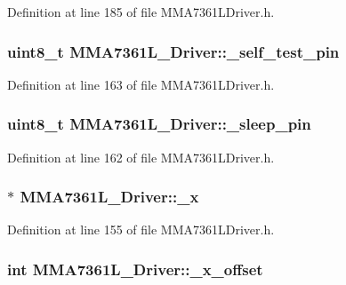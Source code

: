 \-Definition at line 185 of file \-M\-M\-A7361\-L\-Driver.\-h.

\hypertarget{class_m_m_a7361_l___driver_a99cc8f1c06bd9e3c25efa6369f5918f8}{
\subsubsection[{\-\_\-self\-\_\-test\-\_\-pin}]{\setlength{\rightskip}{0pt plus 5cm}uint8\-\_\-t {\bf \-M\-M\-A7361\-L\-\_\-\-Driver\-::\-\_\-self\-\_\-test\-\_\-pin}}}\label{class_m_m_a7361_l___driver_a99cc8f1c06bd9e3c25efa6369f5918f8}


\-Definition at line 163 of file \-M\-M\-A7361\-L\-Driver.\-h.

\hypertarget{class_m_m_a7361_l___driver_a8d123ee5fb711beadf02a8e6230a91dc}{
\subsubsection[{\-\_\-sleep\-\_\-pin}]{\setlength{\rightskip}{0pt plus 5cm}uint8\-\_\-t {\bf \-M\-M\-A7361\-L\-\_\-\-Driver\-::\-\_\-sleep\-\_\-pin}}}\label{class_m_m_a7361_l___driver_a8d123ee5fb711beadf02a8e6230a91dc}


\-Definition at line 162 of file \-M\-M\-A7361\-L\-Driver.\-h.

\hypertarget{class_m_m_a7361_l___driver_a754cbcff98237680540eed964592a519}{
\subsubsection[{\-\_\-x}]{$\ast$ {\bf \-M\-M\-A7361\-L\-\_\-\-Driver\-::\-\_\-x}}}\label{class_m_m_a7361_l___driver_a754cbcff98237680540eed964592a519}


\-Definition at line 155 of file \-M\-M\-A7361\-L\-Driver.\-h.

\hypertarget{class_m_m_a7361_l___driver_af3ba686fabfc2bfa1af0c3e88ce4b2ff}{
\subsubsection[{\-\_\-x\-\_\-offset}]{\setlength{\rightskip}{0pt plus 5cm}int {\bf \-M\-M\-A7361\-L\-\_\-\-Driver\-::\-\_\-x\-\_\-offset}}}\label{class_m_m_a7361_l___driver_af3ba686fabfc2bfa1af0c3e88ce4b2ff}


